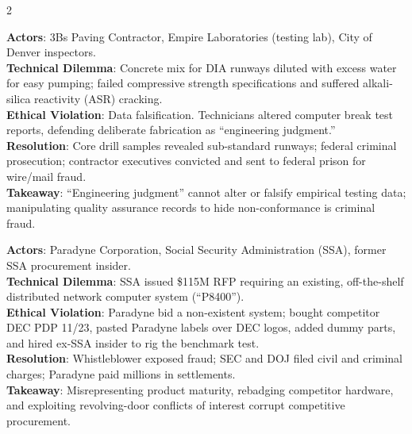 \documentclass[9pt,a4paper]{extarticle}
\begin{document}
\begin{multicols}{2}
\begin{tcolorbox}[casebox,title={17. Denver Airport Runway Concrete (1990s)}]
\textbf{Actors}: 3Bs Paving Contractor, Empire Laboratories (testing lab), City of Denver inspectors.\\
\textbf{Technical Dilemma}: Concrete mix for DIA runways diluted with excess water for easy pumping; failed compressive strength specifications and suffered alkali-silica reactivity (ASR) cracking.\\
\textbf{Ethical Violation}: Data falsification. Technicians altered computer break test reports, defending deliberate fabrication as ``engineering judgment.''\\
\textbf{Resolution}: Core drill samples revealed sub-standard runways; federal criminal prosecution; contractor executives convicted and sent to federal prison for wire/mail fraud.\\
\textbf{Takeaway}: ``Engineering judgment'' cannot alter or falsify empirical testing data; manipulating quality assurance records to hide non-conformance is criminal fraud.
\end{tcolorbox}

\begin{tcolorbox}[casebox,title={18. Paradyne Computers RFP Fraud (1980)}]
\textbf{Actors}: Paradyne Corporation, Social Security Administration (SSA), former SSA procurement insider.\\
\textbf{Technical Dilemma}: SSA issued \$115M RFP requiring an existing, off-the-shelf distributed network computer system (``P8400'').\\
\textbf{Ethical Violation}: Paradyne bid a non-existent system; bought competitor DEC PDP 11/23, pasted Paradyne labels over DEC logos, added dummy parts, and hired ex-SSA insider to rig the benchmark test.\\
\textbf{Resolution}: Whistleblower exposed fraud; SEC and DOJ filed civil and criminal charges; Paradyne paid millions in settlements.\\
\textbf{Takeaway}: Misrepresenting product maturity, rebadging competitor hardware, and exploiting revolving-door conflicts of interest corrupt competitive procurement.
\end{tcolorbox}


\end{multicols}
\end{document}
